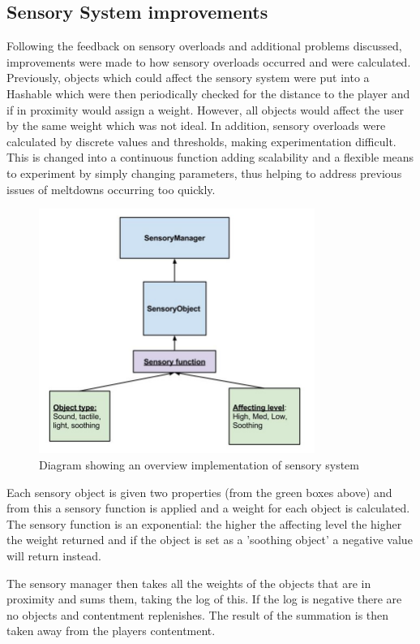\documentclass[11pt]{report}
\begin{document}
\subsection{Sensory System improvements}
Following the feedback on sensory overloads and additional problems discussed, improvements were made to how sensory overloads occurred and were calculated. Previously, objects which could affect the sensory system were put into a Hashable which were then periodically checked for the distance to the player and if in proximity would assign a weight. However, all objects would affect the user by the same weight which was not ideal. In addition, sensory overloads were calculated by discrete values and thresholds, making experimentation difficult. This is changed into a continuous function adding scalability and a flexible means to experiment by simply changing parameters, thus helping to address previous issues of meltdowns occurring too quickly.

\begin{figure}[H]
\centering
\includegraphics[width=90mm]{images/sensoryobjects.jpg}
\caption{Diagram showing an overview implementation of sensory system}
\label{sensorysystem}
\end{figure}

Each sensory object is given two properties (from the green boxes above) and from this a sensory function is applied and a weight for each object is calculated. The sensory function is an exponential: the higher the affecting level the higher the weight returned and if the object is set as a 'soothing object' a negative value will return instead. 

The sensory manager then takes all the weights of the objects that are in proximity and sums them, taking the log of this. If the log is negative there are no objects and contentment replenishes. The result of the summation is then taken away from the players contentment. 
\end{document}
